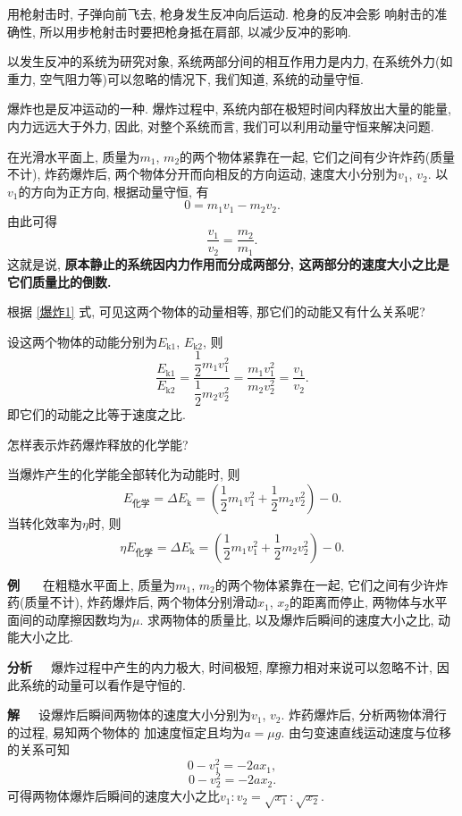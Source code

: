 \documentclass[11pt,a4paper]{ctexbook}
\newcounter{exam}[chapter]
\newcommand{\bre}{\ \ \ }
\newcommand{\examlabel}{\textbf{例\theexam}}
\newenvironment{example}{\bigskip\par\refstepcounter{exam}\examlabel\bre}{\par}
\begin{document}
用枪射击时, 子弹向前飞去, 枪身发生反冲向后运动. 枪身的反冲会影
响射击的准确性, 所以用步枪射击时要把枪身抵在肩部,
以减少反冲的影响.

以发生反冲的系统为研究对象, 系统两部分间的相互作用力是内力,
在系统外力(如重力, 空气阻力等)可以忽略的情况下, 我们知道,
系统的动量守恒.

爆炸也是反冲运动的一种. 爆炸过程中,
系统内部在极短时间内释放出大量的能量, 内力远远大于外力,
因此, 对整个系统而言, 我们可以利用动量守恒来解决问题.

在光滑水平面上, 质量为$m_1$, $m_2$的两个物体紧靠在一起, 它们之间有少许炸药(质量不计), 炸药爆炸后,
两个物体分开而向相反的方向运动, 速度大小分别为$v_1$, $v_2$. 以
$v_1$的方向为正方向, 根据动量守恒, 有
\begin{equation}
    0 = m_1v_1 - m_2v_2.
    \label{爆炸1}
\end{equation}
由此可得$$\frac{v_1}{v_2} = \frac{m_2}{m_1}.$$
这就是说, \textbf{原本静止的系统因内力作用而分成两部分, 这两部分的速度大小之比是它们质量比的倒数.}

{\kaishu 根据 \eqref{爆炸1} 式, 可见这两个物体的动量相等, 那它们的动能又有什么关系呢?}

设这两个物体的动能分别为$E_\mathrm{k1}$, $E_\mathrm{k2}$, 则
$$\frac{E_\mathrm{k1}}{E_\mathrm{k2}} = \frac{\dfrac12 m_1v_1^2}{\dfrac12m_2v_2^2} = \frac{m_1v_1^2}{m_2v_2^2} = \frac{v_1}{v_2}.$$
即它们的动能之比等于速度之比.

{\kaishu 怎样表示炸药爆炸释放的化学能?}

当爆炸产生的化学能全部转化为动能时, 则
$$E_\text{化学} = \Delta E_\mathrm{k} = \left(\frac12m_1v_1^2 + \frac12m_2v_2^2\right)-0.$$
当转化效率为$\eta$时, 则
$$\eta E_\text{化学} = \Delta E_\mathrm{k} = \left(\frac12m_1v_1^2 + \frac12m_2v_2^2\right)-0.$$

\begin{example}
    在粗糙水平面上, 质量为$m_1$, $m_2$的两个物体紧靠在一起,
它们之间有少许炸药(质量不计), 炸药爆炸后,
两个物体分别滑动$x_1$, $x_2$的距离而停止,
两物体与水平面间的动摩擦因数均为$\mu$.
求两物体的质量比, 以及爆炸后瞬间的速度大小之比, 动能大小之比.
\end{example}

\textbf{分析}\bre 爆炸过程中产生的内力极大, 时间极短, 摩擦力相对来说可以忽略不计,
因此系统的动量可以看作是守恒的.

\textbf{解}\bre 设爆炸后瞬间两物体的速度大小分别为$v_1$, $v_2$.
炸药爆炸后, 分析两物体滑行的过程, 易知两个物体的
加速度恒定且均为$a = \mu g$. 由匀变速直线运动速度与位移的关系可知
$$0 - v_1^2 = -2ax_1,$$ $$0 - v_2^2 = -2ax_2.$$
可得两物体爆炸后瞬间的速度大小之比$v_1: v_2 = \sqrt{x_1}: \sqrt{x_2}$.
\end{document}

